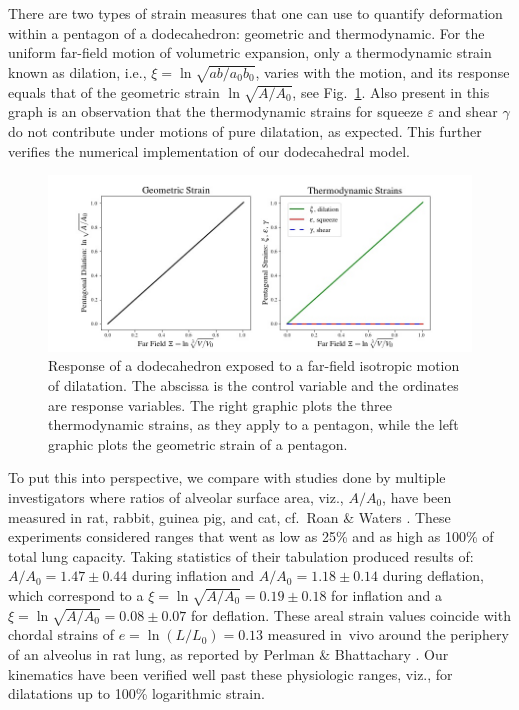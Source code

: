 There are two types of strain measures that one can use to quantify deformation within a pentagon of a dodecahedron: geometric and thermo\-dynamic.  For the uniform far-field motion of volumetric expansion, only a thermo\-dynamic strain known as dilation, i.e., $\xi = \ln \sqrt{ab/a_0b_0}$, varies with the motion, and its response equals that of the geometric strain $\ln \sqrt{A / A_0}$, see Fig.~\ref{figDilatation2}.  Also present in this graph is an observation that the thermo\-dynamic strains for squeeze $\varepsilon$ and shear $\gamma$ do not contribute under motions of pure dilatation, as expected.  This further verifies the numerical implementation of our dodecahedral model.

\begin{figure}
	\centering
	\includegraphics[width=\textwidth]{figures/dilatationGeoVsThermo.jpg}
	\caption{Response of a dodecahedron exposed to a far-field isotropic motion of dilatation.  The abscissa is the control variable and the ordinates are response variables. The right graphic plots the three thermo\-dynamic strains, as they apply to a pentagon, while the left graphic plots the geometric strain of a pentagon.}
	\label{figDilatation2}
\end{figure}

To put this into perspective, we compare with studies done by multiple investigators where ratios of alveolar surface area, viz., $A/A_0$, have been measured in rat, rabbit, guinea pig, and cat, cf.\ Roan \& Waters \cite[Table~1]{RoanWaters11}.  These experiments considered ranges that went as low as 25\% and as high as 100\% of total lung capacity.  Taking statistics of their tabulation produced results of: $A/A_0 = 1.47 \pm 0.44$ during inflation and $A/A_0 = 1.18 \pm 0.14$ during deflation, which correspond to a $\xi = \ln\sqrt{A/A_0} = 0.19 \pm 0.18$ for inflation and a $\xi = \ln\sqrt{A/A_0} = 0.08 \pm 0.07$ for deflation.  These areal strain values coincide with chordal strains of $e=\ln(L/L_0) = 0.13$ measured in~vivo around the periphery of an alveolus in rat lung, as reported by Perlman \& Bhattachary \cite{PerlmanBhattacharya07}.  Our kinematics have been verified well past these physiologic ranges, viz., for dilatations up to 100\% logarithmic strain. 

